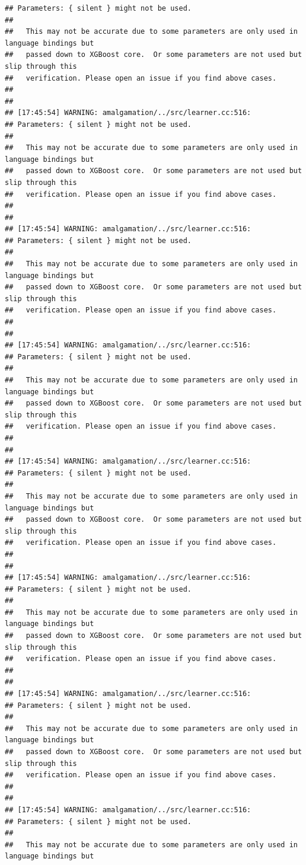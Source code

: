 \documentclass[AMS,STIX2COL]{WileyNJD-v2}\usepackage[]{graphicx}\usepackage[]{color}
\makeatletter
\newenvironment{kframe}{%
 \def\at@end@of@kframe{}%
 \ifinner\ifhmode%
  \def\at@end@of@kframe{\end{minipage}}%
  \begin{minipage}{\columnwidth}%
 \fi\fi%
 \def\FrameCommand##1{\hskip\@totalleftmargin \hskip-\fboxsep
 \colorbox{shadecolor}{##1}\hskip-\fboxsep
     \hskip-\linewidth \hskip-\@totalleftmargin \hskip\columnwidth}%
 \MakeFramed {\advance\hsize-\width
   \@totalleftmargin\z@ \linewidth\hsize
   \@setminipage}}%
 {\par\unskip\endMakeFramed%
 \at@end@of@kframe}
\newenvironment{knitrout}{}{} %
\makeatother
\begin{document}
\begin{knitrout}
\begin{kframe}
\begin{verbatim}
## Parameters: { silent } might not be used.
## 
##   This may not be accurate due to some parameters are only used in language bindings but
##   passed down to XGBoost core.  Or some parameters are not used but slip through this
##   verification. Please open an issue if you find above cases.
## 
## 
## [17:45:54] WARNING: amalgamation/../src/learner.cc:516: 
## Parameters: { silent } might not be used.
## 
##   This may not be accurate due to some parameters are only used in language bindings but
##   passed down to XGBoost core.  Or some parameters are not used but slip through this
##   verification. Please open an issue if you find above cases.
## 
## 
## [17:45:54] WARNING: amalgamation/../src/learner.cc:516: 
## Parameters: { silent } might not be used.
## 
##   This may not be accurate due to some parameters are only used in language bindings but
##   passed down to XGBoost core.  Or some parameters are not used but slip through this
##   verification. Please open an issue if you find above cases.
## 
## 
## [17:45:54] WARNING: amalgamation/../src/learner.cc:516: 
## Parameters: { silent } might not be used.
## 
##   This may not be accurate due to some parameters are only used in language bindings but
##   passed down to XGBoost core.  Or some parameters are not used but slip through this
##   verification. Please open an issue if you find above cases.
## 
## 
## [17:45:54] WARNING: amalgamation/../src/learner.cc:516: 
## Parameters: { silent } might not be used.
## 
##   This may not be accurate due to some parameters are only used in language bindings but
##   passed down to XGBoost core.  Or some parameters are not used but slip through this
##   verification. Please open an issue if you find above cases.
## 
## 
## [17:45:54] WARNING: amalgamation/../src/learner.cc:516: 
## Parameters: { silent } might not be used.
## 
##   This may not be accurate due to some parameters are only used in language bindings but
##   passed down to XGBoost core.  Or some parameters are not used but slip through this
##   verification. Please open an issue if you find above cases.
## 
## 
## [17:45:54] WARNING: amalgamation/../src/learner.cc:516: 
## Parameters: { silent } might not be used.
## 
##   This may not be accurate due to some parameters are only used in language bindings but
##   passed down to XGBoost core.  Or some parameters are not used but slip through this
##   verification. Please open an issue if you find above cases.
## 
## 
## [17:45:54] WARNING: amalgamation/../src/learner.cc:516: 
## Parameters: { silent } might not be used.
## 
##   This may not be accurate due to some parameters are only used in language bindings but

\end{verbatim}
\end{kframe}
\end{knitrout}
\end{document}
